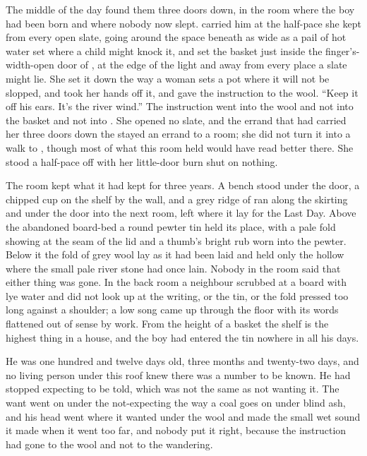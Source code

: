 The middle of the day found them three doors down, in the room where the boy had been born and where nobody now slept.  carried him at the half-pace she kept from every open slate, going around the space beneath  as wide as a pail of hot water set where a child might knock it, and set the basket just inside the finger's-width-open door of , at the edge of the light and away from every place a slate might lie. She set it down the way a woman sets a pot where it will not be slopped, and took her hands off it, and gave the instruction to the wool. “Keep it off his ears. It's the river wind.” The instruction went into the wool and not into the basket and not into . She opened no slate, and the errand that had carried her three doors down the  stayed an errand to a room; she did not turn it into a walk to , though most of what this room held would have read better there. She stood a half-pace off with her little-door burn shut on nothing.

The room kept what it had kept for three years. A bench stood under the door, a chipped cup on the shelf by the wall, and a grey ridge of  ran along the skirting and under the door into the next room, left where it lay for the Last Day. Above the abandoned board-bed a round pewter tin held its place, with a pale fold showing at the seam of the lid and a thumb's bright rub worn into the pewter. Below it the fold of grey wool lay as it had been laid and held only the hollow where the small pale river stone had once lain. Nobody in the room said that either thing was gone. In the back room a neighbour scrubbed at a board with lye water and did not look up at the writing, or the tin, or the fold pressed too long against a shoulder; a low song came up through the floor with its words flattened out of sense by work. From the height of a basket the shelf is the highest thing in a house, and the boy had entered the tin nowhere in all his days.

He was one hundred and twelve days old, three months and twenty-two days, and no living person under this roof knew there was a number to be known. He had stopped expecting to be told, which was not the same as not wanting it. The want went on under the not-expecting the way a coal goes on under blind ash, and his head went where it wanted under the wool and made the small wet sound it made when it went too far, and nobody put it right, because the instruction had gone to the wool and not to the wandering.

